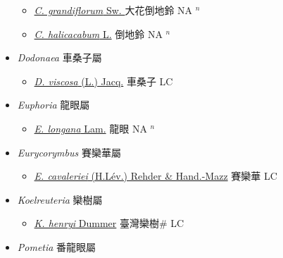 \begin{itemize}
  \begin{itemize}
        \item[] \href{http://www.theplantlist.org/tpl1.1/search?q=Cardiospermum+grandiflorum}{\textit{C. grandiflorum} Sw. }   大花倒地鈴 NA $^n$
        \item[] \href{http://www.theplantlist.org/tpl1.1/search?q=Cardiospermum+halicacabum}{\textit{C. halicacabum} L.}   倒地鈴 NA $^n$
  \end{itemize}
 \item[] \textit{Dodonaea} 車桑子屬
                    
  \begin{itemize}
        \item[] \href{http://www.theplantlist.org/tpl1.1/search?q=Dodonaea+viscosa}{\textit{D. viscosa} (L.) Jacq.}   車桑子 LC
  \end{itemize}
 \item[] \textit{Euphoria} 龍眼屬
                    
  \begin{itemize}
        \item[] \href{http://www.theplantlist.org/tpl1.1/search?q=Euphoria+longana}{\textit{E. longana} Lam.}   龍眼 NA $^n$
  \end{itemize}
 \item[] \textit{Eurycorymbus} 賽欒華屬
                    
  \begin{itemize}
        \item[] \href{http://www.theplantlist.org/tpl1.1/search?q=Eurycorymbus+cavaleriei}{\textit{E. cavaleriei} (H.Lév.) Rehder \& Hand.-Mazz}   賽欒華 LC
  \end{itemize}
 \item[] \textit{Koelreuteria} 欒樹屬
                    
  \begin{itemize}
        \item[] \href{http://www.theplantlist.org/tpl1.1/search?q=Koelreuteria+henryi}{\textit{K. henryi} Dummer}   臺灣欒樹\# LC
  \end{itemize}
 \item[] \textit{Pometia} 番龍眼屬
                    

\end{itemize}
